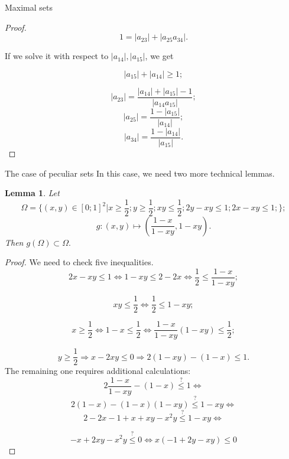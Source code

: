 \documentclass[12pt]{article}
\newtheorem{lemma}{Lemma}[section]
\begin{document}
\begin{section}{Maximal sets}
\begin{proof}
    $$
        1 = |a_{23}| + |a_{25}a_{34}|.
    $$
    
    If we solve it with respect to $|a_{14}|,|a_{15}|$, we get 
    
        $$
            |a_{15}| + |a_{14}|\geq 1;
        $$ 
        
        $$
            |a_{23}| = \frac{|a_{14}| + |a_{15}| - 1}{|a_{14}a_{15}|};
        $$
        $$
            |a_{25}| = \frac{1-|a_{15}|}{|a_{14}|};
        $$
        $$
            |a_{34}| = \frac{1-|a_{14}|}{|a_{15}|}.
        $$
        
    \end{proof}

    
\end{section}

\begin{section}{ The case of peculiar sets}
\label{s7}
    In this case, we need two more technical lemmas. 
    \begin{lemma}
    \label{omega}
        Let 
        $$
            \Omega = \{(x,y) \in [0;1]^{2} | x\geq \frac{1}{2}; y\geq\frac{1}{2};xy\leq \frac{1}{2};2y-xy\leq 1; 2x-xy\leq 1;  \};
        $$
        $$
            g:(x,y)\mapsto \left(\frac{1-x}{1-xy}, 1-xy\right ).
        $$
        Then $g(\Omega)\subset \Omega.$
    \end{lemma}
    
    \begin{proof}
        
        We need to check five inequalities.
        $$
            2x-xy\leq 1 \Leftrightarrow 1 - xy \leq 2 -2x \Leftrightarrow \frac{1}{2} \leq \frac{1-x}{1-xy};
        $$
    
        $$
            xy \leq \frac{1}{2} \Leftrightarrow \frac{1}{2}\leq 1 - xy;
        $$
    
        $$
            x\geq \frac{1}{2} \Leftrightarrow 1 - x \leq \frac{1}{2} \Leftrightarrow \frac{1-x}{1-xy}(1-xy)\leq \frac{1}{2};
        $$
    
        $$
            y\geq \frac{1}{2} \Rightarrow x-2xy\leq 0 \Rightarrow 2(1-xy) - (1-x) \leq 1.
        $$
       The remaining one requires additional calculations:
        $$
            2\frac{1-x}{1-xy} - (1-x) \stackrel{?}{\leq} 1 \Leftrightarrow 
        $$
        $$
            2(1-x)- (1-x)(1-xy) \stackrel{?}{\leq} 1 -xy \Leftrightarrow
        $$
        $$
            2-2x- 1+x+xy-x^2y  \stackrel{?}{\leq} 1 -xy \Leftrightarrow
        $$
    
          $$
            -x + 2xy-x^2y  \stackrel{?}{\leq} 0 \Leftrightarrow x(-1 + 2y-xy)  
     \leq 0 
        $$
    \end{proof}
    

\end{section}
\end{document}

